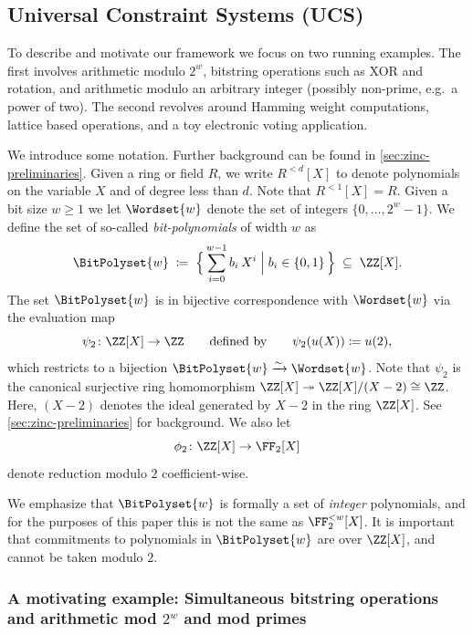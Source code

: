 \subsection{Universal Constraint Systems (UCS)}\label{s:crypto_ucs}


To describe and motivate our framework we focus on two running examples. The first involves arithmetic modulo $2^{w}$, bitstring operations such as XOR and rotation, and arithmetic modulo an arbitrary integer (possibly non-prime, e.g.\ a power of two).  The second revolves around Hamming weight computations, lattice based operations, and a toy electronic voting application. %

We introduce some notation. Further background can be found in \cref{sec:zinc-preliminaries}. Given a ring or field $R$, we write $R^{<d}[X]$ to denote polynomials on the variable $X$ and of degree less than $d$. Note that $R^{<1}[X]=R$.   Given a bit size $w\ge 1$ we let $\Wordset{w}$ denote the set of integers $\{0,\ldots, 2^w-1\}$. We define the set of so-called \emph{bit-polynomials} of width $w$ as
%
\begin{equation}
\label{eq:def-bitpolyset}
  \BitPolyset{w} \;\coloneqq\; \Bigl\{\, \sum_{i=0}^{w-1} b_i\, X^i \;\Big|\; b_i \in \{0,1\} \,\Bigr\} \;\subseteq\; \ZZ[X].
\end{equation}
%
The set $\BitPolyset{w}$ is in bijective correspondence with $\Wordset{w}$ via the evaluation map $$\psi_2\colon\ZZ[X] \to \ZZ \qquad{\text{defined by}} \qquad \psi_2(u(X)) \coloneqq u(2),$$ which restricts to a bijection $\BitPolyset{w}\xrightarrow{\sim}\Wordset{w}$. Note that $\psi_2$ is the canonical surjective ring homomorphism $\ZZ[X] \twoheadrightarrow \ZZ[X]/(X-2)\cong \ZZ$. Here, $(X-2)$ denotes the ideal generated by $X-2$ in the ring $\ZZ[X]$. See \cref{sec:zinc-preliminaries} for background. We also let 
$$\phi_2\colon\ZZ[X] \to \FF_2[X]$$ denote reduction modulo $2$ coefficient-wise.

We emphasize that $\BitPolyset{w}$ is formally a set of \emph{integer} polynomials, and for the purposes of this paper this is not the same as $\FF_2^{<w}[X]$. It is important that commitments to polynomials in $\BitPolyset{w}$ are over $\ZZ[X]$, and cannot be taken modulo $2$. 

\subsubsection{A motivating example: Simultaneous bitstring operations and arithmetic mod $2^w$ and mod primes}

